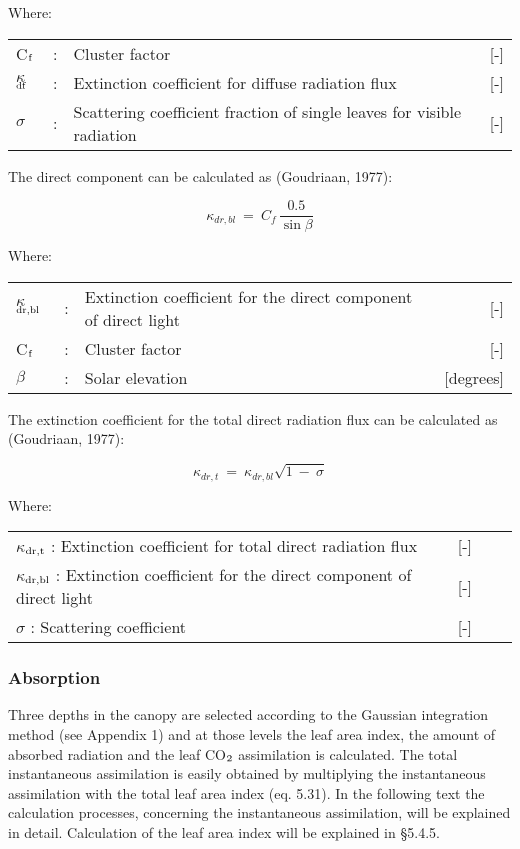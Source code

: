 Where:\\
\begin{tabularx}{\textwidth}{llXr}
C$_{{\rm f}}$ &:& Cluster factor    &    [-]\\
$\kappa$$_{{\rm df}}$ &:& Extinction coefficient for diffuse radiation flux   &     [-]\\
$\sigma$ &:& Scattering coefficient fraction of single leaves for
   visible radiation  &      [-]\\
\end{tabularx}

The direct component can be calculated as (Goudriaan, 1977):

\begin{equation}
\kappa _{dr,bl} ~=~{ C _{f} }\,{\frac{0.5}{\sin \beta }}
\end{equation}

Where:\\
\begin{tabularx}{\textwidth}{llXr}
$\kappa$$_{{\rm dr,bl}}$ &:& Extinction coefficient for the direct component of direct light   &     [-] \\
C$_{{\rm f}}$ &:& Cluster factor     &   [-]\\
$\beta$ &:& Solar elevation     &   [degrees]\\
\end{tabularx}

The extinction coefficient for the total direct radiation flux can be calculated as (Goudriaan, 1977):

\begin{equation}
\kappa _{dr,t} ~=~ \kappa _{dr,bl} \sqrt{1~-~\sigma }
\end{equation}

Where:\\
\begin{tabularx}{\textwidth}{llXr}
$\kappa$$_{{\rm dr,t}}$ : Extinction coefficient for total direct radiation flux   &    [-]\\
$\kappa$$_{{\rm dr,bl}}$ : Extinction coefficient for the direct component of direct light  &   [-]\\
 $\sigma$ : Scattering coefficient     &    [-]\\
\end{tabularx}


\subsubsection{Absorption}
Three depths in the canopy are selected according to the Gaussian integration method (see
Appendix 1) and at those levels the leaf area index, the amount of absorbed radiation and
the leaf CO$_{{\rm 2}}$ assimilation is calculated. The total instantaneous assimilation is easily
obtained by multiplying the instantaneous assimilation with the total leaf area index (eq.
5.31). In the following text the calculation processes, concerning the instantaneous
assimila\-tion, will be explained in detail. Calculation of the leaf area index will be
explained in \S 5.4.5.

